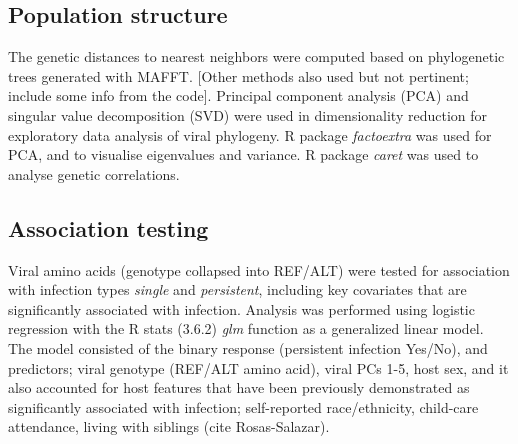 \documentclass{article}
\begin{document}
\subsection{Population structure}
The genetic distances to nearest neighbors were computed based on phylogenetic 
trees generated with MAFFT.
[Other methods also used but not pertinent; include some info from the code].
Principal component analysis (PCA) and singular value decomposition (SVD) were used in dimensionality reduction for exploratory data analysis of viral phylogeny.
R package \textit{factoextra} was used for PCA, and to visualise eigenvalues and variance. 
R package \textit{caret} was used to analyse genetic correlations.

\subsection{Association testing}
Viral amino acids (genotype collapsed into REF/ALT) were tested for association with infection types \textit{single} and \textit{persistent}, 
including key covariates that are significantly associated with infection.
Analysis was performed using logistic regression with the
R stats (3.6.2) \textit{glm} function as a generalized linear model.
The model consisted of the binary response (persistent infection Yes/No), and predictors; viral genotype (REF/ALT amino acid), viral PCs 1-5, host sex, and it also accounted for host features that have been previously demonstrated as significantly associated with infection; 
self-reported race/ethnicity, child-care attendance, living with siblings (cite Rosas-Salazar).




\end{document}
